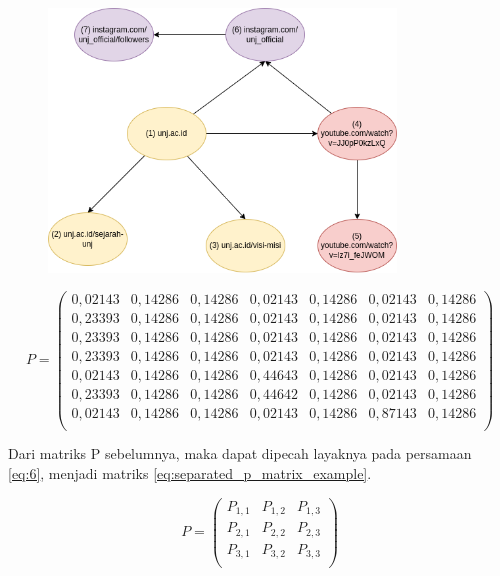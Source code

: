 \begin{figure}[H]
	\centering
	\includegraphics[height=7cm, keepaspectratio]{gambar/web_graph}
	\caption{}
	\label{gambar:web_graph}
\end{figure}

\begingroup
\makeatletter
\def\f@size{10}
\check@mathfonts
\begin{equation}
\label{eq:p_matrix_example}
	P =
	\begin{pmatrix}
		0,02143 & 0,14286 & 0,14286 & 0,02143 & 0,14286 & 0,02143 & 0,14286 \\
		0,23393 & 0,14286 & 0,14286 & 0,02143 & 0,14286 & 0,02143 & 0,14286 \\
		0,23393 & 0,14286 & 0,14286 & 0,02143 & 0,14286 & 0,02143 & 0,14286 \\
		0,23393 & 0,14286 & 0,14286 & 0,02143 & 0,14286 & 0,02143 & 0,14286 \\
		0,02143 & 0,14286 & 0,14286 & 0,44643 & 0,14286 & 0,02143 & 0,14286 \\
		0,23393 & 0,14286 & 0,14286 & 0,44642 & 0,14286 & 0,02143 & 0,14286 \\
		0,02143 & 0,14286 & 0,14286 & 0,02143 & 0,14286 & 0,87143 & 0,14286 \\
	\end{pmatrix}
\end{equation}
\endgroup

Dari matriks P sebelumnya, maka dapat dipecah layaknya pada persamaan \ref{eq:6}, menjadi matriks \ref{eq:separated_p_matrix_example}.

\begin{equation}
\label{eq:separated_p_matrix_symbol}
	P =
	\begin{pmatrix}
		P_{1,1} & P_{1,2} & P_{1,3} \\
		P_{2,1} & P_{2,2} & P_{2,3} \\
		P_{3,1} & P_{3,2} & P_{3,3} \\
	\end{pmatrix}
\end{equation}


